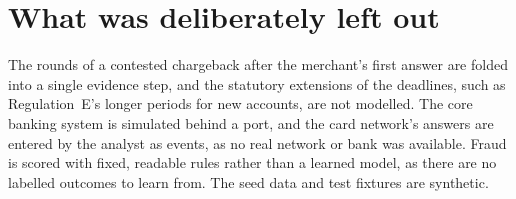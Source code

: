 \section{What was deliberately left out}
\label{sec:req-scope}

The rounds of a contested chargeback after the merchant's first answer are folded into a single
evidence step, and the statutory extensions of the deadlines, such as Regulation~E's longer
periods for new accounts, are not modelled. The core banking system is simulated behind a port,
and the card network's answers are entered by the analyst as events, as no real network or bank
was available. Fraud is scored with fixed, readable rules rather than a learned model, as there are
no labelled outcomes to learn from. The seed data and test fixtures are synthetic.
